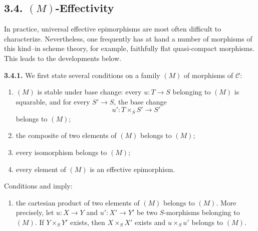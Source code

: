 \subsection*{3.4. \((M)\)-Effectivity}

In practice, universal effective epimorphisms are most often difficult to
characterize. Nevertheless, one frequently has at hand a number of
morphisms of this kind--in scheme theory, for example, faithfully flat
quasi-compact morphisms. This leads to the developments below.

\medskip
\noindent{}\textbf{3.4.1.}
We first state several conditions on a family \((M)\) of morphisms of
\(\mathscr C\):
\begin{enumerate}
  \item[(a)] \((M)\) is stable under base change: every
  \(u:T\to S\) belonging to \((M)\) is squarable, and for every
  \(S'\to S\), the base change
  \[
    u':T\times_S S'\longrightarrow S'
  \]
  belongs to \((M)\);
  \item[(b)] the composite of two elements of \((M)\) belongs to \((M)\);
  \item[(c)] every isomorphism belongs to \((M)\);
  \item[(d)] every element of \((M)\) is an effective epimorphism.
\end{enumerate}

Conditions  and  imply:
\begin{enumerate}
  \item[(a$'$)] the cartesian product of two elements of \((M)\) belongs
  to \((M)\). More precisely, let \(u:X\to Y\) and \(u':X'\to Y'\) be two
  \(S\)-morphisms belonging to \((M)\). If \(Y\times_S Y'\) exists, then
  \(X\times_S X'\) exists and \(u\times_Su'\) belongs to \((M)\).
\end{enumerate}

